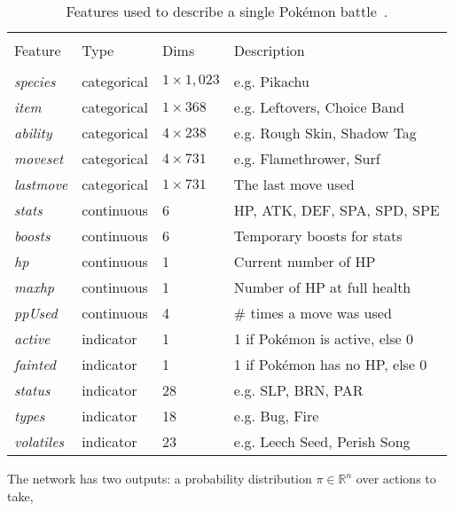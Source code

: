 \begin{table}[h]
\centering
\caption{Features used to describe a single Pokémon battle~\autocite{Huang_Lee_2019}.}
\label{tbl:HuangLee-Pokemon-Table}
    \begin{tabular}{llll}
    \hline \\
    Feature             & Type        & Dims            & Description                 \\
    \hline \\
    \emph{species}      & categorical & $1 \times 1,023$ & e.g. Pikachu                \\
    \emph{item}         & categorical & $1 \times 368$  & e.g. Leftovers, Choice Band  \\
    \emph{ability}      & categorical & $4 \times 238$  & e.g. Rough Skin, Shadow Tag \\
    \emph{moveset}      & categorical & $4 \times 731$  & e.g. Flamethrower, Surf     \\
    \emph{lastmove}     & categorical & $1 \times 731$  & The last move used          \\
    \emph{stats}        & continuous  & 6               & \ac{HP}, \ac{ATK}, \ac{DEF}, \ac{SPA}, \ac{SPD}, \ac{SPE} \\
    \emph{boosts}       & continuous  & 6               & Temporary boosts for stats \\
    \emph{hp}           & continuous  & 1               & Current number of \ac{HP} \\
    \emph{maxhp}        & continuous  & 1               & Number of \ac{HP} at full health \\
    \emph{ppUsed}       & continuous  & 4               & \# times a move was used \\
    \emph{active}       & indicator   & 1               & 1 if Pokémon is active, else 0 \\
    \emph{fainted}      & indicator   & 1               & 1 if Pokémon has no \ac{HP}, else 0 \\
    \emph{status}       & indicator   & 28              & e.g. \ac{SLP}, \ac{BRN}, \ac{PAR} \\
    \emph{types}        & indicator   & 18              & e.g. Bug, Fire \\
    \emph{volatiles}    & indicator   & 23              & e.g. Leech Seed, Perish Song
    \end{tabular}
\end{table}
The network has two outputs: a probability distribution $\pi \in \mathbb{R}^n$ over actions to take, 
